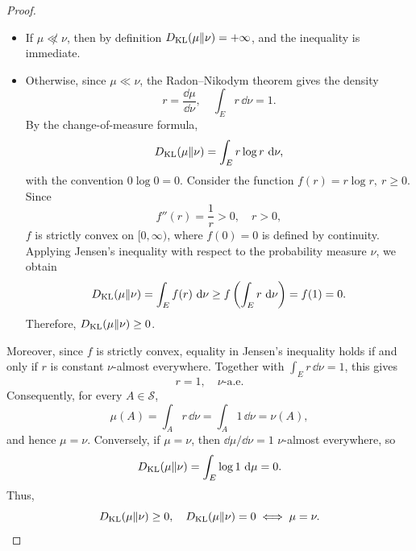 \documentclass[12pt,a4paper,oneside]{book}
\begin{document}
\begin{proof}
    \begin{itemize}
        \item If $\mu\not\ll\nu$, then by definition $D_{\mathrm{KL}}(\mu\Vert\nu)=+\infty$, and the inequality is immediate.
        \item Otherwise, since $\mu\ll\nu$, the Radon--Nikodym theorem gives the density
            \begin{equation*}
                r=\frac{\dd\mu}{\dd\nu}, \quad \int_E r\,\dd\nu=1.
            \end{equation*}
            By the change-of-measure formula,
            \begin{equation*}
                D_{\mathrm{KL}}(\mu\Vert\nu) = \int_E r\log r\,\,\mathrm{d}\nu,
            \end{equation*}
            with the convention $0\log0=0$. Consider the function $f(r)=r\log r,\ r\geq0$. Since
            \begin{equation*}
                f''(r)=\frac{1}{r}>0,\quad r>0,
            \end{equation*}
            $f$ is strictly convex on $[0,\infty)$, where $f(0)=0$ is defined by continuity. Applying Jensen's inequality 
            with respect to the probability measure $\nu$, we obtain
            \begin{equation*}
                D_{\mathrm{KL}}(\mu\Vert\nu) = \int_E f(r)\,\,\mathrm{d}\nu \geq f\left(\int_E r\,\,\mathrm{d}\nu\right) = f(1) = 0.
            \end{equation*}
            Therefore, $D_{\mathrm{KL}}(\mu\Vert\nu)\geq0$.
    \end{itemize}

Moreover, since $f$ is strictly convex, equality in Jensen's inequality holds if and only if $r$ is constant $\nu$-almost
everywhere. Together with $\int_E r\,\dd\nu=1$, this gives
\begin{equation*}
    r=1,\quad \nu\text{-a.e.}
\end{equation*}
Consequently, for every $A\in\mathcal S$,
\begin{equation*}
    \mu(A) = \int_A r\,\dd\nu = \int_A 1\,\dd\nu = \nu(A),
\end{equation*}
and hence $\mu=\nu$. Conversely, if $\mu=\nu$, then $\dd\mu/\dd\nu=1$ $\nu$-almost everywhere, so
\begin{equation*}
    D_{\mathrm{KL}}(\mu\Vert\nu) = \int_E\log1\,\,\mathrm{d}\mu=0.
\end{equation*}
Thus,
\begin{equation*}
    D_{\mathrm{KL}}(\mu\Vert\nu)\geq0, \quad D_{\mathrm{KL}}(\mu\Vert\nu)=0 \iff \mu=\nu.
\end{equation*}
\end{proof}
\end{document}
